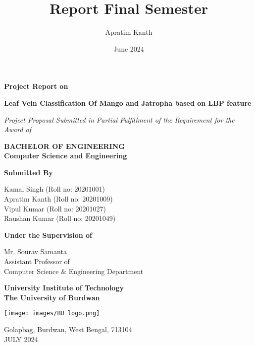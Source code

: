 \documentclass{report}
\title{Report Final Semester}
\author{Apratim Kanth}
\date{June 2024}
\begin{document}
\begin{titlepage}
    \centering

    \textbf{Project Report on}

    \large\textbf{Leaf Vein Classification Of Mango and Jatropha based on LBP feature}

    \vspace{0.2cm}
    \textit{Project Proposal Submitted in Partial Fulfillment of the Requirement for the Award of}

    \vspace{0.2cm}
    \textbf{BACHELOR OF ENGINEERING\\
    Computer Science and Engineering}

    \textbf{Submitted By}

    Kamal Singh (Roll no: 20201001)\\
    Apratim Kanth (Roll no: 20201009)\\
    Vipul Kumar (Roll no: 20201027)\\
    Raushan Kumar (Roll no: 20201049)

    \vspace{0.2cm}
    \textbf{Under the Supervision of}

    \vspace{0.5cm}
    Mr. Sourav Samanta\\
    Assistant Professor of\\
    Computer Science \& Engineering Department

    \textbf{University Institute of Technology\\
    The University of Burdwan}

    \texttt{[image: images/BU logo.png]} %

    \vspace{1cm}
    Golapbag, Burdwan, West Bengal, 713104\\
    JULY 2024

\end{titlepage}
\end{document}
